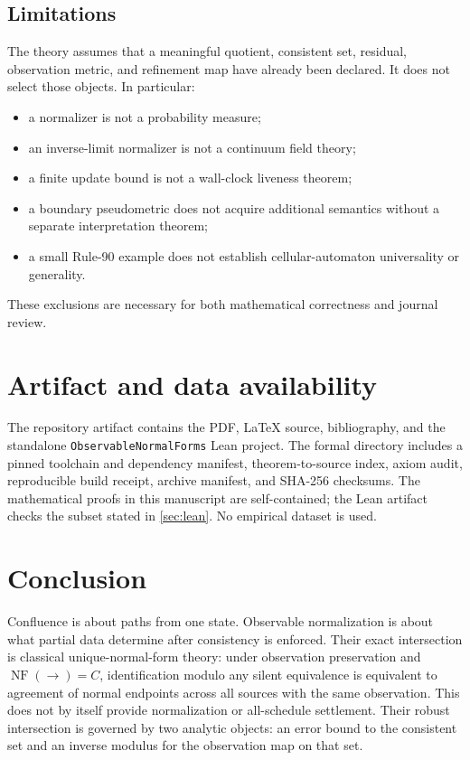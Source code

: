 \documentclass[11pt]{article}
\theoremstyle{definition}
\theoremstyle{remark}
\numberwithin{equation}{section}
\newcommand{\NF}{\operatorname{NF}}
\begin{document}
\subsection{Limitations}

The theory assumes that a meaningful quotient, consistent set, residual, observation metric, and refinement map have already been declared.  It does not select those objects.  In particular:
\begin{itemize}
\item a normalizer is not a probability measure;
\item an inverse-limit normalizer is not a continuum field theory;
\item a finite update bound is not a wall-clock liveness theorem;
\item a boundary pseudometric does not acquire additional semantics without a separate interpretation theorem;
\item a small Rule-90 example does not establish cellular-automaton universality or generality.
\end{itemize}
These exclusions are necessary for both mathematical correctness and journal review.

\section{Artifact and data availability}\label{sec:availability}
The repository artifact contains the PDF, LaTeX source, bibliography, and the
standalone \texttt{ObservableNormalForms} Lean project.  The formal directory
includes a pinned toolchain and dependency manifest, theorem-to-source index,
axiom audit, reproducible build receipt, archive manifest, and SHA-256
checksums.  The mathematical proofs in this manuscript are self-contained;
the Lean artifact checks the subset stated in \cref{sec:lean}.  No empirical
dataset is used.

\section{Conclusion}

Confluence is about paths from one state.  Observable normalization is about what partial data determine after consistency is enforced.  Their exact intersection is classical unique-normal-form theory: under observation preservation and $\NF(\to)=C$, identification modulo any silent equivalence is equivalent to agreement of normal endpoints across all sources with the same observation.  This does not by itself provide normalization or all-schedule settlement.  Their robust intersection is governed by two analytic objects: an error bound to the consistent set and an inverse modulus for the observation map on that set.
\end{document}

